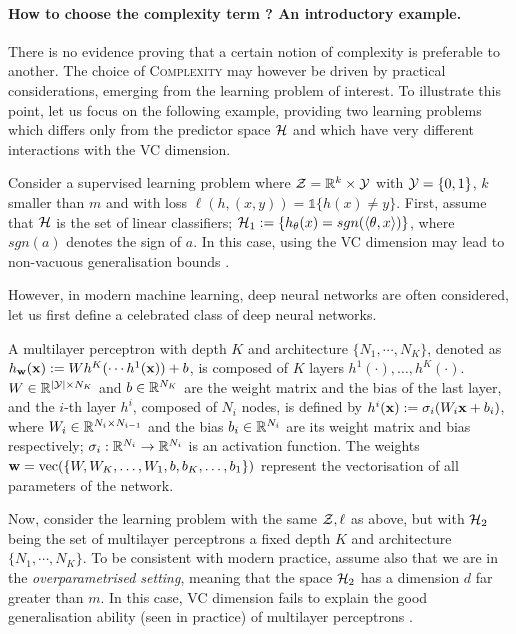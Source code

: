 \paragraph{How to choose the complexity term ? An introductory example.} There is no evidence proving that a certain notion of complexity is preferable to another. The choice of \textsc{Complexity} may however be driven by practical considerations, emerging from the learning problem of interest. To illustrate this point, let us focus on the following example, providing two learning problems which differs only from the predictor space $\mathcal{H}$ and which have very different interactions with the VC dimension.
\begin{example}
  \label{ex: neural_net}
  Consider a supervised learning problem where $\mathcal{Z} = \mathbb{R}^k\times\mathcal{Y}$ with $\mathcal{Y}=\{0,1\}$, $k$ smaller than $m$ and with loss $\ell(h,(x,y))= \mathds{1}\{h(x) \neq y\}$.  First, assume that $\mathcal{H}$ is the set of linear classifiers; \ie $\mathcal{H}_1:= \left\{ h_{\theta}(x)= sgn(\langle \theta,x\rangle)  \right\}$, where $sgn(a)$ denotes the sign of $a$. In this case, using the VC dimension may lead to non-vacuous generalisation bounds \citep{vapnik2000learning}. 

However, in modern machine learning, deep neural networks are often considered, let us first define a celebrated class of deep neural networks. 

\begin{definition}
    \label{def:mlp}
    A multilayer perceptron with depth $K$ and architecture $\{N_1,\cdots,N_K\}$, denoted as $h_{\mathbf{w}}(\mathbf{x}) := Wh^{K}(\cdots h^{1}(\mathbf{x}))+b$, is composed of $K$ layers $h^1(\cdot),\dots,h^K(\cdot)$.
 $W\in\mathbb{R}^{|\mathcal{Y}|\times N_K}$ and $b\in\mathbb{R}^{N_K}$ are the weight matrix and the bias of the last layer, and the $i$-th layer $h^{i}$, composed of $N_i$ nodes, is defined by $h^{i}(\mathbf{x}):=\sigma_i(W_i \mathbf{x} + b_i)$, where $W_i\in\mathbb{R}^{N_i\times N_{i-1}}$ and the bias $b_i\in \mathbb{R}^{N_i}$ are its weight matrix and bias respectively; $\sigma_i : \mathbb{R}^{N_i} \to \mathbb{R}^{N_i} $ is an activation function.
The weights $\mathbf{w}=\operatorname*{\mathrm{vec}}(\{W, W_{K}, \dots, W_1, b, b_{K}, \dots, b_1\})$ represent the vectorisation of all parameters of the network.
\end{definition}
Now, consider the learning problem with the same $\mathcal{Z},\ell$ as above, but with $\mathcal{H}_2$ being the set of multilayer perceptrons \wrt a fixed depth $K$ and architecture $\{N_1,\cdots,N_K\}$. To be consistent with modern practice, assume also that we are in the \emph{overparametrised setting}, meaning that the space $\mathcal{H}_2$ has a dimension $d$ far greater than $m$.
In this case, VC dimension fails to explain the good generalisation ability (seen in practice) of multilayer perceptrons \citep{bartlett2003vapnik}.
\end{example}

